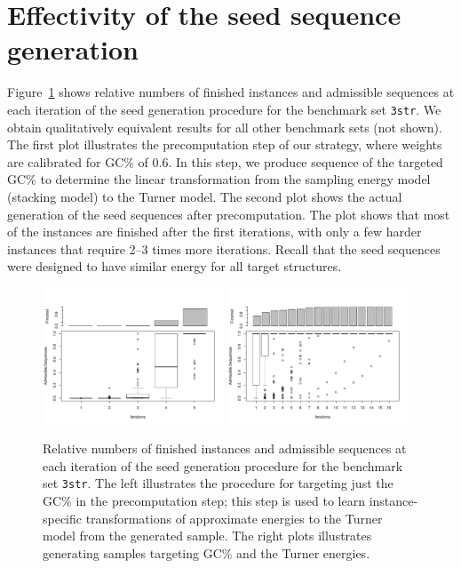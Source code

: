\documentclass[10pt]{article}
\newcommand{\Nuc}[1]{{\sf #1}}
\newcommand{\Cb}{\Nuc{C}}
\newcommand{\Gb}{\Nuc{G}}
\newcommand{\GCb}{\Gb\Cb}
\newenvironment{revision}{\color{red}}{\color{black}}
\begin{document}
\begin{revision}
\section{Effectivity of the seed sequence generation}
\label{appsec:effectivity-seed-generation}

Figure~\ref{appfig:seed-generation} shows relative numbers of finished instances and admissible sequences at each iteration of the seed generation procedure for the benchmark set \texttt{3str}. We obtain qualitatively equivalent results for all other benchmark sets (not shown). The first plot illustrates the  precomputation step of our strategy, where weights are calibrated for \GCb\% of 0.6. In this step, we produce sequence of the targeted \GCb\% to determine the linear transformation from the sampling energy model (stacking model) to the Turner model. The second plot shows the actual generation of the seed sequences after precomputation. The plot shows that most of the instances are finished after the first iterations, with only a few harder instances that require 2--3 times more iterations. Recall that the seed sequences were designed to have similar energy for all target structures.

\begin{figure}[h!]
  \centering
  \includegraphics[width=0.48\textwidth]{Figs/SeedGeneration/iterations_gc_3str.pdf}
  \includegraphics[width=0.48\textwidth]{Figs/SeedGeneration/iterations_en_3str.pdf}
  \caption{Relative numbers of finished instances and admissible sequences at each iteration of the seed generation procedure for the benchmark set \texttt{3str}. The left illustrates the procedure for targeting just the \GCb\% in the precomputation step; this step is used to learn instance-specific transformations of approximate energies to the Turner model from the generated sample. The right plots illustrates generating samples targeting \GCb\% and the Turner energies. }
  \label{appfig:seed-generation}
\end{figure}

\end{revision}
\end{document}

